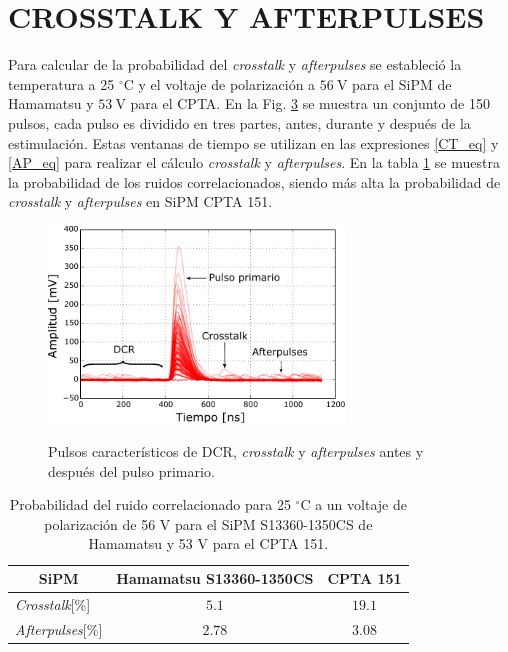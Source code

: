 \begin{figure}[h!]
\begin{subfigure}[b]{0.49\textwidth}
         \label{fig:DCR_vs_th_2}
     \end{subfigure}
        \label{fig:DCR_vs_th}
\end{figure}
\section{CROSSTALK Y AFTERPULSES}
Para calcular de la probabilidad del \textit{crosstalk} y  \textit{afterpulses} se estableció la temperatura a 25 $^\circ$C y el voltaje de polarización a  $56~\mbox{V}$ para el SiPM de Hamamatsu y $53~\mbox{V}$ para el CPTA. En la Fig. \ref{fig:NoiseP} se muestra un conjunto de 150 pulsos, cada pulso es dividido en tres partes, antes, durante y después de la estimulación. Estas ventanas de tiempo se utilizan en las expresiones \ref{CT_eq} y \ref{AP_eq} para realizar el cálculo \textit{crosstalk} y  \textit{afterpulses}. En la tabla \ref{AP_CT} se muestra la probabilidad de los ruidos correlacionados, siendo más alta la probabilidad de  \textit{crosstalk} y  \textit{afterpulses} en SiPM CPTA 151.   
\begin{figure}[h!]
\begin{centering}
  \caption{Pulsos característicos de DCR, \textit{crosstalk} y \textit{afterpulses} antes y después del pulso primario.}
  \includegraphics[width=0.7\textwidth]{Images/100P_1350CS.pdf}
  \label{fig:NoiseP}
  \par\end{centering}
\end{figure}
\begin{table}[h!]
\caption{Probabilidad del ruido correlacionado para 25 $^\circ$C a un voltaje de polarización de 56 V para el SiPM S13360-1350CS de Hamamatsu y 53 V para el CPTA 151.}
    \label{AP_CT}
	\centering
	\begin{tabular}{ c  c  c}
    \hline
    SiPM       & Hamamatsu S13360-1350CS  & CPTA 151      \\ \hline
    \multicolumn{1}{l}{\textit{Crosstalk}[\%] }     &   $5.1$      & $ 19.1$ \\
    \multicolumn{1}{l}{\textit{Afterpulses}[\%]}      & $2.78$         & $3.08$ \\
	\end{tabular}	
\end{table}
